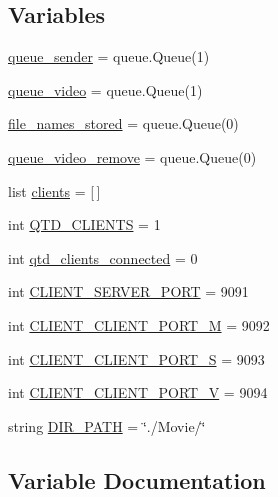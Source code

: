 \subsection*{Variables}
\begin{DoxyCompactItemize}
\item 
\hyperlink{namespace_client_a64ffddc55af3d3b37cdccf4a39e6cd70}{queue\+\_\+sender} = queue.\+Queue(1)
\item 
\hyperlink{namespace_client_afa7cd3abcbd1d11390da8c591f865dd0}{queue\+\_\+video} = queue.\+Queue(1)
\item 
\hyperlink{namespace_client_a17f241c909107116f1f8fac6bd4f62cc}{file\+\_\+names\+\_\+stored} = queue.\+Queue(0)
\item 
\hyperlink{namespace_client_a577f3320669e23faaf700e5f508c17ef}{queue\+\_\+video\+\_\+remove} = queue.\+Queue(0)
\item 
list \hyperlink{namespace_client_a59524e1b096e6ae3baae748f6b0e9369}{clients} = \mbox{[}$\,$\mbox{]}
\item 
int \hyperlink{namespace_client_aee328ecb2f743825e5a4a4dd50b7e520}{Q\+T\+D\+\_\+\+C\+L\+I\+E\+N\+TS} = 1
\item 
int \hyperlink{namespace_client_a5da51babab2510cbc1f0f0a12f604c5e}{qtd\+\_\+clients\+\_\+connected} = 0
\item 
int \hyperlink{namespace_client_af133b942b01c7ec603383365d1f98895}{C\+L\+I\+E\+N\+T\+\_\+\+S\+E\+R\+V\+E\+R\+\_\+\+P\+O\+RT} = 9091
\item 
int \hyperlink{namespace_client_a4be8afee8df970673d8113d763b35bc0}{C\+L\+I\+E\+N\+T\+\_\+\+C\+L\+I\+E\+N\+T\+\_\+\+P\+O\+R\+T\+\_\+M} = 9092
\item 
int \hyperlink{namespace_client_a7a12214af5951cba96d8b598cf78f5ba}{C\+L\+I\+E\+N\+T\+\_\+\+C\+L\+I\+E\+N\+T\+\_\+\+P\+O\+R\+T\+\_\+S} = 9093
\item 
int \hyperlink{namespace_client_ad53a1c68ed4fa767d1518db3f74743c7}{C\+L\+I\+E\+N\+T\+\_\+\+C\+L\+I\+E\+N\+T\+\_\+\+P\+O\+R\+T\+\_\+V} = 9094
\item 
string \hyperlink{namespace_client_acc5a813aa684663f92d06a50fcdf3898}{D\+I\+R\+\_\+\+P\+A\+TH} = \char`\"{}./Movie/\char`\"{}
\end{DoxyCompactItemize}


\subsection{Variable Documentation}
\mbox{\label{namespace_client_a4be8afee8df970673d8113d763b35bc0}} 
